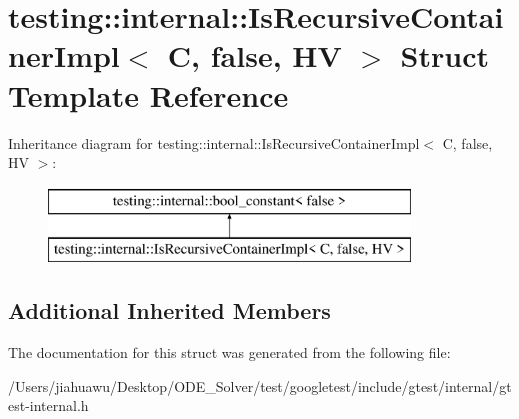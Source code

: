 \hypertarget{structtesting_1_1internal_1_1_is_recursive_container_impl_3_01_c_00_01false_00_01_h_v_01_4}{}\section{testing\+:\+:internal\+:\+:Is\+Recursive\+Container\+Impl$<$ C, false, HV $>$ Struct Template Reference}
\label{structtesting_1_1internal_1_1_is_recursive_container_impl_3_01_c_00_01false_00_01_h_v_01_4}
Inheritance diagram for testing\+:\+:internal\+:\+:Is\+Recursive\+Container\+Impl$<$ C, false, HV $>$\+:\begin{figure}[H]
\begin{center}
\leavevmode
\includegraphics[height=2.000000cm]{structtesting_1_1internal_1_1_is_recursive_container_impl_3_01_c_00_01false_00_01_h_v_01_4}
\end{center}
\end{figure}
\subsection*{Additional Inherited Members}


The documentation for this struct was generated from the following file\+:\begin{DoxyCompactItemize}
\item 
/\+Users/jiahuawu/\+Desktop/\+O\+D\+E\+\_\+\+Solver/test/googletest/include/gtest/internal/gtest-\/internal.\+h\end{DoxyCompactItemize}
